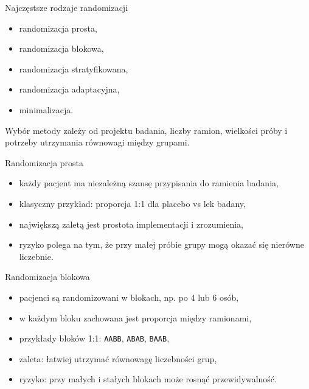 \begin{frame}{Najczęstsze rodzaje randomizacji}
  \begin{itemize}
    \item randomizacja prosta,
    \item randomizacja blokowa,
    \item randomizacja stratyfikowana,
    \item randomizacja adaptacyjna,
    \item minimalizacja.
  \end{itemize}

  \vspace{0.25cm}

  \begin{ExampleBox}
    Wybór metody zależy od projektu badania, liczby ramion, wielkości próby i potrzeby utrzymania równowagi między grupami.
  \end{ExampleBox}
\end{frame}

\begin{frame}{Randomizacja prosta}
  \begin{itemize}
    \item każdy pacjent ma niezależną szansę przypisania do ramienia badania,
    \item klasyczny przykład: proporcja 1:1 dla placebo vs lek badany,
    \item największą zaletą jest prostota implementacji i zrozumienia,
    \item ryzyko polega na tym, że przy małej próbie grupy mogą okazać się nierówne liczebnie.
  \end{itemize}
\end{frame}

\begin{frame}{Randomizacja blokowa}
  \begin{itemize}
    \item pacjenci są randomizowani w blokach, np. po 4 lub 6 osób,
    \item w każdym bloku zachowana jest proporcja między ramionami,
    \item przykłady bloków 1:1: \texttt{AABB}, \texttt{ABAB}, \texttt{BAAB},
    \item zaleta: łatwiej utrzymać równowagę liczebności grup,
    \item ryzyko: przy małych i stałych blokach może rosnąć przewidywalność.
  \end{itemize}
\end{frame}

